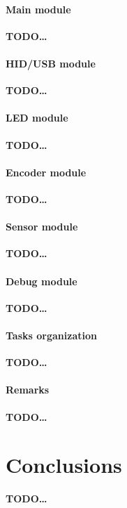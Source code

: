 \documentclass[a4paper,10pt]{article}
\newcommand{\TODO}{\textbf{TODO\dots\ }}
\begin{document}
\begin{multicols}{2}
\paragraph{Main module}
\TODO


\paragraph{HID/USB module}
\TODO


\paragraph{LED module}
\TODO


\paragraph{Encoder module}
\TODO


\paragraph{Sensor module}
\TODO


\paragraph{Debug module}
\TODO


\paragraph{Tasks organization}
\TODO


\paragraph{Remarks}
\TODO


\section{Conclusions}
\label{sec:conclusions}

\TODO





\end{multicols}
\end{document}
